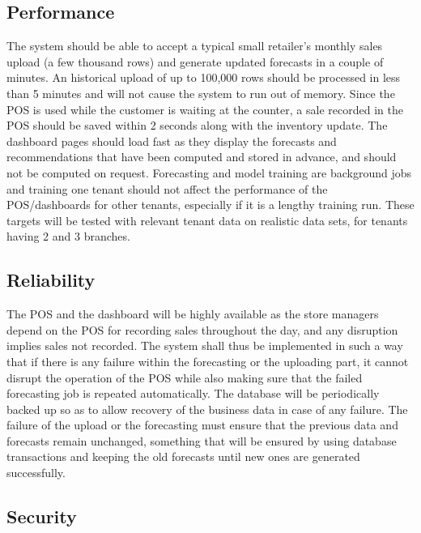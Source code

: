 \documentclass{StockSense}
\begin{document}
\subsection{Performance}

The system should be able to accept a typical small retailer's monthly sales upload (a few thousand rows) and generate updated forecasts in a couple of minutes. An historical upload of up to 100,000 rows should be processed in less than 5 minutes and will not cause the system to run out of memory. Since the POS is used while the customer is waiting at the counter, a sale recorded in the POS should be saved within 2 seconds along with the inventory update. The dashboard pages should load fast as they display the forecasts and recommendations that have been computed and stored in advance, and should not be computed on request. Forecasting and model training are background jobs and training one tenant should not affect the performance of the POS/dashboards for other tenants, especially if it is a lengthy training run. These targets will be tested with relevant tenant data on realistic data sets, for tenants having 2 and 3 branches.

\subsection{Reliability}

The POS and the dashboard will be highly available as the store managers depend on the POS for recording sales throughout the day, and any disruption implies sales not recorded. The system shall thus be implemented in such a way that if there is any failure within the forecasting or the uploading part, it cannot disrupt the operation of the POS while also making sure that the failed forecasting job is repeated automatically. The database will be periodically backed up so as to allow recovery of the business data in case of any failure. The failure of the upload or the forecasting must ensure that the previous data and forecasts remain unchanged, something that will be ensured by using database transactions and keeping the old forecasts until new ones are generated successfully.

\subsection{Security}
\end{document}
